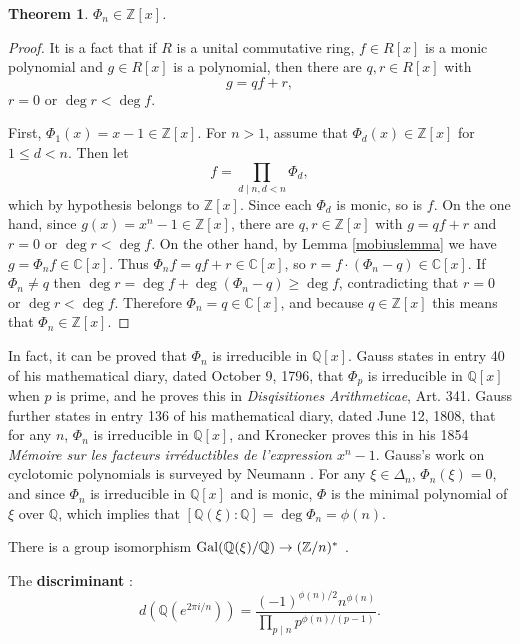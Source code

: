 \documentclass{article}
\newcommand{\Gal}{\ensuremath\mathrm{Gal}}
\newtheorem{theorem}{Theorem}
\theoremstyle{definition}
\begin{document}
\begin{theorem}
$\Phi_n \in \mathbb{Z}[x]$.
\label{Zx}
\end{theorem}
\begin{proof}
It is a fact that if $R$ is a unital commutative ring, $f \in R[x]$ is a monic polynomial and
$g \in R[x]$ is a polynomial, then there are $q,r \in R[x]$ with
\[
g = qf+r,
\]
$r=0$ or $\deg r < \deg f$.

First, $\Phi_1(x)=x-1 \in \mathbb{Z}[x]$. For $n>1$, assume that
$\Phi_d(x) \in \mathbb{Z}[x]$ for $1 \leq d < n$. Then let
\[
f = \prod_{d \mid n, d<n} \Phi_d,
\]
which by hypothesis belongs to $\mathbb{Z}[x]$. Since each $\Phi_d$ is monic, so is $f$. 
On the one hand,
since $g(x)=x^n-1 \in \mathbb{Z}[x]$, there are $q,r \in \mathbb{Z}[x]$ with
$g = q f + r$ and
$r=0$ or $\deg r < \deg f$.
On the other hand, by Lemma \ref{mobiuslemma} we have
$g = \Phi_n f \in \mathbb{C}[x]$. 
Thus $\Phi_n f = qf+r \in \mathbb{C}[x]$, 
so $r = f \cdot (\Phi_n - q) \in \mathbb{C}[x]$. If $\Phi_n \neq q$ then $\deg r = \deg f + \deg (\Phi_n-q) \geq \deg f$, contradicting that
$r=0$ or $\deg r < \deg f$. Therefore $\Phi_n = q \in \mathbb{C}[x]$, and because $q \in \mathbb{Z}[x]$ this means that
$\Phi_n \in \mathbb{Z}[x]$. 
\end{proof}

In fact, it can be proved that
$\Phi_n$ is irreducible in $\mathbb{Q}[x]$. Gauss states in entry 40 of his mathematical diary, dated
October 9, 1796, that 
$\Phi_p$ is irreducible in $\mathbb{Q}[x]$ when $p$ is prime, and he proves this
in {\em Disqisitiones Arithmeticae}, Art. 341.
Gauss further states in entry 136 of his mathematical diary, dated June 12, 1808, that for any $n$,
$\Phi_n$ is irreducible in $\mathbb{Q}[x]$, and Kronecker proves this in his
1854 {\em M\'emoire sur les facteurs irr\'eductibles de l'expression $x^n-1$}.
Gauss's work on cyclotomic polynomials is surveyed by Neumann \cite{neumannDA}.
For any $\xi \in \Delta_n$, $\Phi_n(\xi)=0$, and since $\Phi_n$ is irreducible in $\mathbb{Q}[x]$ and is monic, $\Phi$ is the minimal
polynomial of $\xi$ over $\mathbb{Q}$, which implies that $[\mathbb{Q}(\xi):\mathbb{Q}]=\deg \Phi_n=\phi(n)$.

There is a group isomorphism $\Gal(\mathbb{Q}(\xi)/\mathbb{Q}) \to (\mathbb{Z}/n)^*$ \cite[p.~596, Theorem 26]{dummit}.

The \textbf{discriminant} \cite[p.~12, Proposition 2.7]{washington}:
\[
d(\mathbb{Q}(e^{2\pi i/n})) = \frac{(-1)^{\phi(n)/2} n^{\phi(n)}}{\prod_{p \mid n} p^{\phi(n)/(p-1)}}. 
\]
\end{document}
